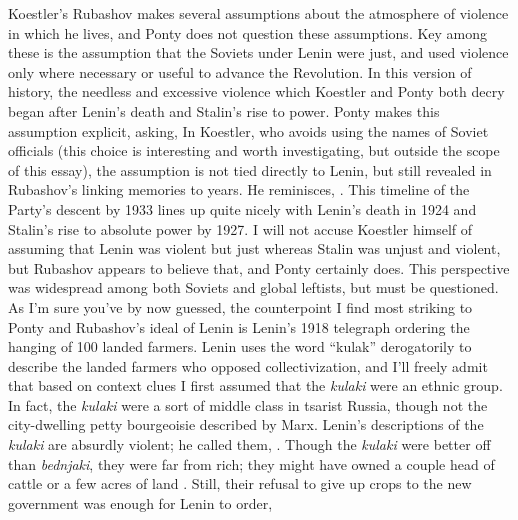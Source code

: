 
Koestler's Rubashov makes several assumptions about the atmosphere of violence in which he
lives, and Ponty does not question these assumptions. Key among these is the assumption
that the Soviets under Lenin were just, and used violence only where necessary or useful
to advance the Revolution. In this version of history, the needless and excessive violence
which Koestler and Ponty both decry began after Lenin's death and Stalin's rise to
power. Ponty makes this assumption explicit, asking,
 In Koestler, who avoids using the names of Soviet officials
(this choice is interesting and worth investigating, but outside the scope of this essay),
the assumption is not tied directly to Lenin, but still revealed in Rubashov's linking
memories to years. He reminisces, . This timeline of the Party's descent by 1933 lines up quite nicely with Lenin's
death in 1924 and Stalin's rise to absolute power by 1927. I will not accuse Koestler
himself of assuming that Lenin was violent but just whereas Stalin was unjust and violent,
but Rubashov appears to believe that, and Ponty certainly does. This perspective was
widespread among both Soviets and global leftists, but must be questioned. As I'm sure
you've by now guessed, the counterpoint I find most striking to Ponty and Rubashov's ideal
of Lenin is Lenin's 1918 telegraph ordering the hanging of 100 landed farmers. Lenin uses
the word \enquote{kulak} derogatorily to describe the landed farmers who opposed
collectivization, and I'll freely admit that based on context clues I first assumed that
the \textit{kulaki} were an ethnic group. In fact, the \textit{kulaki} were a sort of
middle class in tsarist Russia, though not the city-dwelling petty bourgeoisie described
by Marx. Lenin's descriptions of the \textit{kulaki} are absurdly violent; he called them,
. Though the \textit{kulaki} were better off than
\textit{bednjaki}, they were far from rich; they might have owned a couple head of cattle
or a few acres of land \parencite[94]{conquest}. Still, their refusal to give up crops to
the new government was enough for Lenin to order,

